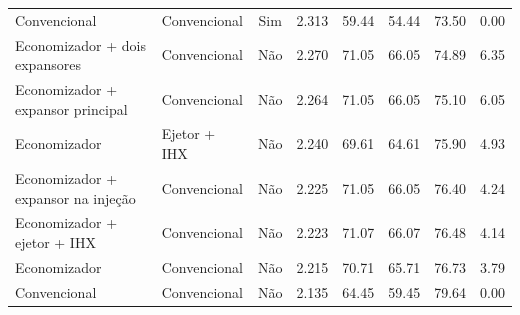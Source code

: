 {\begin{tabular}{llcrrrrr}
Convencional & Convencional & Sim & 2.313 & 59.44 & 54.44 & 73.50 & 0.00 \\
Economizador + dois expansores & Convencional & Não & 2.270 & 71.05 & 66.05 & 74.89 & 6.35 \\
Economizador + expansor principal & Convencional & Não & 2.264 & 71.05 & 66.05 & 75.10 & 6.05 \\
Economizador & Ejetor + IHX & Não & 2.240 & 69.61 & 64.61 & 75.90 & 4.93 \\
Economizador + expansor na injeção & Convencional & Não & 2.225 & 71.05 & 66.05 & 76.40 & 4.24 \\
Economizador + ejetor + IHX & Convencional & Não & 2.223 & 71.07 & 66.07 & 76.48 & 4.14 \\
Economizador & Convencional & Não & 2.215 & 70.71 & 65.71 & 76.73 & 3.79 \\
Convencional & Convencional & Não & 2.135 & 64.45 & 59.45 & 79.64 & 0.00 \\
\bottomrule
\end{tabular}
}
